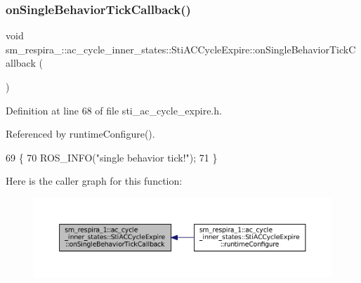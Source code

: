 \subsubsection{\texorpdfstring{on\+Single\+Behavior\+Tick\+Callback()}{onSingleBehaviorTickCallback()}}
{\footnotesize\ttfamily void sm\+\_\+respira\+\_\+::ac\+\_\+cycle\+\_\+inner\+\_\+states\+::\+Sti\+A\+C\+Cycle\+Expire\+::on\+Single\+Behavior\+Tick\+Callback (\begin{DoxyParamCaption}{ }\end{DoxyParamCaption})\hspace{0.3cm}{\ttfamily [inline]}}



Definition at line 68 of file sti\+\_\+ac\+\_\+cycle\+\_\+expire.\+h.



Referenced by runtime\+Configure().


\begin{DoxyCode}
69   \{
70     ROS\_INFO(\textcolor{stringliteral}{"single behavior tick!"});
71   \}
\end{DoxyCode}
Here is the caller graph for this function\+:
\nopagebreak
\begin{figure}[H]
\begin{center}
\leavevmode
\includegraphics[width=350pt]{structsm__respira__1_1_1ac__cycle__inner__states_1_1StiACCycleExpire_abf27619c790ae390ba117175408dff54_icgraph}
\end{center}
\end{figure}
\mbox{\label{structsm__respira__1_1_1ac__cycle__inner__states_1_1StiACCycleExpire_a9f01d2f0b1003702adfb6dbac0a75e8d}} 
